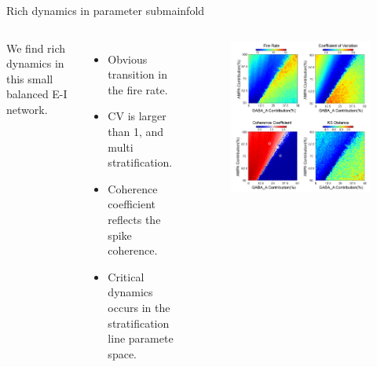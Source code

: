 \documentclass{beamer}
\begin{document}
\begin{frame}{Rich dynamics in parameter submainfold}
	\begin{columns}
		We find rich dynamics in this small balanced E-I network.
		\begin{itemize}
			\item Obvious transition in the fire rate.
			\item CV is larger than 1, and multi stratification.
			\item Coherence coefficient reflects the spike coherence.
			\item Critical dynamics occurs in the stratification line paramete space.
		\end{itemize}
		\begin{figure}[htbp]
			\centering
			\includegraphics[width=0.95\linewidth]{fig/2d_heatmap}
		\end{figure}
	\end{columns}
\end{frame}
\end{document}
